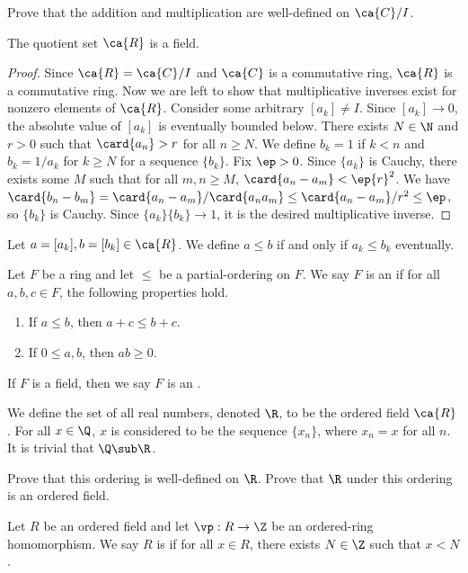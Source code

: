 \documentclass[10pt]{article}
\begin{document}
\begin{problem}
    Prove that the addition and multiplication are well-defined on $\ca{C}/I$.
\end{problem}
\begin{proposition}
    The quotient set $\ca{R}$ is a field.
\end{proposition}
\begin{proof}
    Since $\ca{R}=\ca{C}/I$ and $\ca{C}$ is a commutative ring, $\ca{R}$ is a commutative ring. Now we are left to show that multiplicative inverses exist for nonzero elements of $\ca{R}$. Consider some arbitrary $[{a}_{k}]\ne I$. Since $[{a}_{k}]\to 0$, the absolute value of $[{a}_{k}]$ is eventually bounded below. There exists $N\in\N$ and $r>0$ such that $\card{{a}_{n}}>r$ for all $n\ge N$. We define ${b}_{k}=1$ if $k<n$ and ${b}_{k}=1/{a}_{k}$ for $k\ge N$ for a sequence $\{{b}_{k}\}$. Fix $\ep>0$. Since $\{{a}_{k}\}$ is Cauchy, there exists some $M$ such that for all $m,n\ge M$, $\card{{a}_{n}-{a}_{m}}<\ep{r}^{2}$. We have $\card{{b}_{n}-{b}_{m}}=\card{{a}_{n}-{a}_{m}}/\card{{a}_{n}{a}_{m}}\le\card{{a}_{n}-{a}_{m}}/{r}^{2}\le\ep$, so $\{{b}_{k}\}$ is Cauchy. Since $\{{a}_{k}\}\{{b}_{k}\}\to 1$, it is the desired multiplicative inverse.
\end{proof}
\par
Let $a=[{a}_{k}],b=[{b}_{k}]\in\ca{R}$. We define $a\le b$ if and only if ${a}_{k}\le{b}_{k}$ eventually.
\begin{definition}
    Let $F$ be a ring and let $\le$ be a partial-ordering on $F$. We say $F$ is an  if for all $a,b,c\in F$, the following properties hold.
    \begin{enumerate}
        \item If $a\le b$, then $a+c\le b+c$.
        \item If $0\le a,b$, then $ab\ge 0$.
    \end{enumerate}
    If $F$ is a field, then we say $F$ is an .
\end{definition}
\par
We define the set of all real numbers, denoted $\R$, to be the ordered field $\ca{R}$. For all $x\in\Q$, $x$ is considered to be the sequence $\{{x}_{n}\}$, where ${x}_{n}=x$ for all $n$. It is trivial that $\Q\sub\R$.
\begin{problem}
    Prove that this ordering is well-defined on $\R$. Prove that $\R$ under this ordering is an ordered field.
\end{problem}
\begin{definition}
    Let $R$ be an ordered field and let $\vp:R\to\Z$ be an ordered-ring homomorphism. We say $R$ is  if for all $x\in R$, there exists $N\in\Z$ such that $x<N$.
\end{definition}
\end{document}
